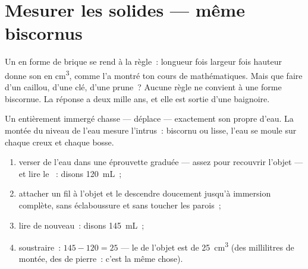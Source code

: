 \section{Mesurer les solides --- même biscornus}

Un  en forme de brique se rend à la règle~: longueur fois
largeur fois hauteur donne son  en \unit{cm^3}, comme l'a
montré ton cours de mathématiques. Mais que faire d'un caillou, d'une
clé, d'une prune~? Aucune règle ne convient à une forme biscornue. La
réponse a deux mille ans, et elle est sortie d'une baignoire.

\begin{proposition}[Le déplacement]\label{prop:g6:mass-and-volume:displacement}
Un  entièrement immergé chasse --- déplace --- exactement son
propre  d'eau. La montée du niveau de l'eau mesure
l'intrus~: biscornu ou lisse, l'eau se moule sur chaque creux et
chaque bosse.
\end{proposition}

\begin{method}\label{met:g6:mass-and-volume:rise}
\begin{enumerate}
  \item verser de l'eau dans une éprouvette graduée --- assez pour
        recouvrir l'objet --- et lire le ~: disons
        \qty{120}{mL}~;
  \item attacher un fil à l'objet et le descendre doucement
        jusqu'à immersion complète, sans éclaboussure et sans
        toucher les parois~;
  \item lire de nouveau~: disons \qty{145}{mL}~;
  \item soustraire~: $145 - 120 = 25$ --- le  de l'objet est
        de \qty{25}{cm^3} (des millilitres de montée, des
         de pierre~: c'est la même chose).
\end{enumerate}
\end{method}

